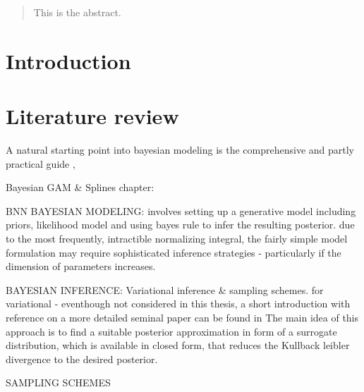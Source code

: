 \documentclass[11pt]{article}
\begin{document}
    \clearpage
    \begin{abstract}
        This is the abstract.
    \end{abstract}

    \section{Introduction}

    \section{Literature review}
    A natural starting point into bayesian modeling is the comprehensive and partly practical guide \citep{gelman2013bayesian},

    Bayesian GAM \& Splines
    \citep{fahrmeir2013regression} chapter:

    BNN
    BAYESIAN MODELING: involves setting up a generative model including priors, likelihood model and using bayes rule to infer the resulting posterior. due to the most frequently, intractible normalizing integral, the fairly simple model formulation may require sophisticated inference strategies - particularly if the dimension of parameters increases.

    BAYESIAN INFERENCE: Variational inference \& sampling schemes. for variational - eventhough not considered in this thesis, a short introduction with reference on a more detailed seminal paper can be found in
    \citep{zhu2017big} The main idea of this approach is to find a suitable posterior approximation in form of a surrogate distribution, which is available in closed form, that reduces the Kullback leibler divergence to the desired posterior.



    SAMPLING SCHEMES
\end{document}
